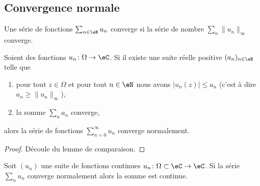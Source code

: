 \subsection{Convergence normale}

Une série de fonctions \( \sum_{n\in \eN}u_n \) converge  si la série de nombre \( \sum_n\| u_n \|_{\infty}\) converge.

\begin{lemma}
    Soient des fonctions \( u_n\colon \Omega\to \eC\). Si il existe une suite réelle positive \( (a_n)_{n\in \eN}\) telle que
    \begin{enumerate}
        \item
            pour tout \( z\in \Omega\) et pour tout \( n\in \eN\) nous avons \( | u_n(z) |\leq a_n\) (c'est à dire \( a_n\geq \| u_n \|_{\infty}\)),
        \item
            la somme \( \sum_{n}a_n\) converge,
    \end{enumerate}
    alors la série de fonctions \( \sum_{n=0}^{\infty}u_n\) converge normalement.
\end{lemma}

\begin{proof}
    Découle du lemme de comparaison.
\end{proof}

\begin{proposition}
    Soit \( (u_n)\) une suite de fonctions continues \( u_n\colon \Omega\subset\eC\to \eC\). Si la série \( \sum_nu_n\) converge normalement alors la somme est continue.
\end{proposition}

